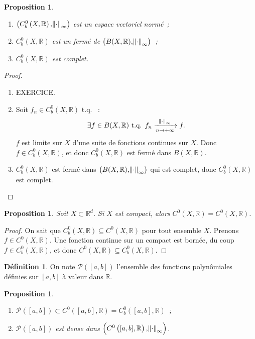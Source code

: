 \documentclass{report}
\newtheorem{prp}[thm]{Proposition}
\theoremstyle{definition}
\newtheorem{déf}[thm]{Définition}
\theoremstyle{remark}
\numberwithin{equation}{section}
\newcommand{\R}{\mathbb R}
\newcommand{\tq}{\text{ t.q. }}
\newcommand{\evfn}[3]{\left(#1\left(#2, #3\right), \norm {\cdot}_{\infty}\right)}
\newcommand{\evnC}[3]{{\evfn {C^{#1}}{#2}{#3}}}
\newcommand{\evnCb}[3]{{\evfn {C_b^{#1}}{#2}{#3}}}
\newcommand{\pinfty}{{+\infty}}
\newcommand{\evn}{espace vectoriel normé}
\begin{document}
		\begin{prp}~
		\begin{enumerate}
			\item $\evnCb0X\R$ est un \evn~;
			\item $C^0_b(X, \R)$ est un fermé de $\left(B(X, \R), \norm \cdot_\infty\right)$~;
			\item $C^0_b(X, \R)$ est complet.
		\end{enumerate}
		\end{prp}

		\begin{proof}~
		\begin{enumerate}
			\item EXERCICE.
			\item Soit $f_n \in C^0_b(X, \R) \tq$~:
			\begin{equation}
				\exists f \in B(X, \R) \tq f_n \xrightarrow[n \to \pinfty]{\norm \cdot_\infty} f.
			\end{equation}
			$f$ est limite sur $X$ d'une suite de fonctions continues sur $X$. Donc $f \in C^0_b(X, \R)$, et donc $C^0_b(X, \R)$ est fermé dans $B(X, \R)$.
			\item $C^0_b(X, \R)$ est fermé dans $\left(B(X, \R), \norm \cdot_\infty\right)$ qui est complet, donc $C^0_b(X, \R)$ est complet.
		\end{enumerate}
		\end{proof}

		\begin{prp} Soit $X \subset \R^d$. Si $X$ est compact, alors $C^0(X, \R) = C^0(X, \R)$.
		\end{prp}

		\begin{proof} On sait que $C^0_b(X, \R) \subseteq C^0(X, \R)$ pour tout ensemble $X$. Prenons $f \in C^0(X, \R)$. Une fonction continue sur un compact
		est bornée, du coup $f \in C^0_b(X, \R)$, et donc $C^0(X, \R) \subseteq C^0_b(X, \R)$.
		\end{proof}

		\begin{déf} On note $\mathcal P([a, b])$ l'ensemble des fonctions polynômiales définies sur $[a, b]$ à valeur dans $\R$.
		\end{déf}

		\begin{prp}~
		\begin{enumerate}
			\item $\mathcal P([a, b]) \subset C^0([a, b], \R) = C^0_b([a, b], \R)$~;
			\item $\mathcal P([a, b])$ est dense dans $\evnC0{[a, b]}\R$.
		\end{enumerate}
		\end{prp}
\end{document}
